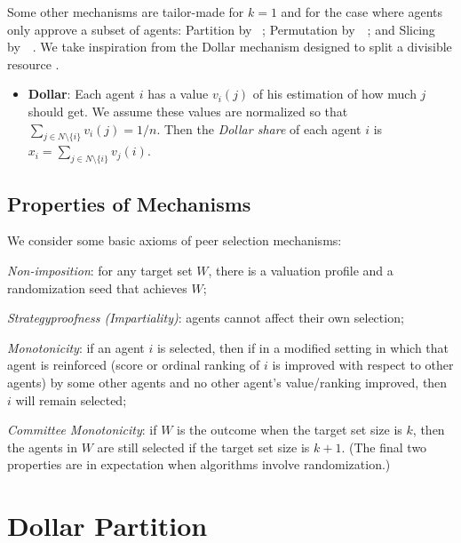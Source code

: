 \documentclass[letterpaper]{article}
\newcommand{\citet}[1]{\citeauthor{#1}~\shortcite{#1}}
\begin{document}
Some other mechanisms are tailor-made for $k=1$ and for the case where agents only approve a subset of agents: Partition by \citet{HoMo13a}; Permutation by~\citet{FeKl14a}; and Slicing by~\citet{BNV14a}.
We take inspiration from the Dollar mechanism designed to split a divisible resource \cite{CMT08a}.



\begin{itemize}
\item \textbf{Dollar}: Each agent $i$ has a value $v_{i}(j)$ of his estimation of how much $j$ should get. We assume these values are normalized so that $\sum_{j\in N\setminus \{i\}}v_i(j)=1/n$. Then the \emph{Dollar share} of each agent $i$ is $x_i=\sum_{j\in N\setminus \{i\}}v_j(i)$.
\end{itemize}








\subsection{Properties of Mechanisms}

We consider some basic axioms of peer selection mechanisms:
\begin{inparaenum}[(i)]
	\item \emph{Non-imposition}: for any target set $W$, there is a valuation profile and a randomization seed that achieves $W$;
	\item \emph{Strategyproofness (Impartiality)}: agents cannot affect their own selection;
	\item \emph{Monotonicity}: if an agent $i$ is selected, then if in a modified setting in which that agent is reinforced (score or ordinal ranking of $i$ is improved with respect to other agents) by some other agents and no other agent's value/ranking improved, then $i$ will remain selected;
	\item \emph{Committee Monotonicity}: if $W$ is the outcome when the target set size is $k$, then the agents in $W$ are still selected if the target set size is $k+1$. (The final two properties are in expectation when algorithms involve randomization.)
\end{inparaenum}




\section{Dollar Partition}
\end{document}
